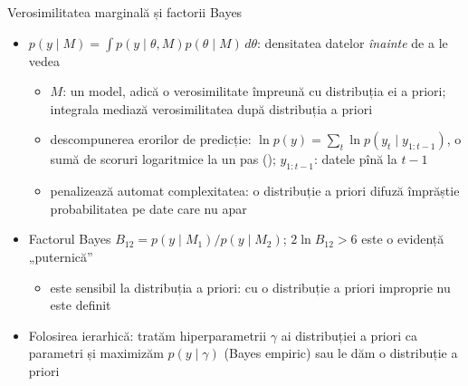 \begin{frame}{Verosimilitatea marginală și factorii Bayes}
\itemsize{\small}
\begin{itemize}
    \item \hypertarget{ch5ml}{}$p(y\mid M) = \int p(y\mid\theta, M)p(\theta\mid M)\,d\theta$: densitatea datelor \emph{înainte} de a le vedea
    \begin{itemize}
        \item $M$: un model, adică o verosimilitate împreună cu distribuția ei a priori; integrala mediază verosimilitatea după distribuția a priori
        \item descompunerea erorilor de predicție: $\ln p(y) = \sum_t \ln p(y_t\mid y_{1:t-1})$, o sumă de scoruri logaritmice la un pas (); $y_{1:t-1}$: datele pînă la $t - 1$
        \item penalizează automat complexitatea: o distribuție a priori difuză împrăștie probabilitatea pe date care nu apar
    \end{itemize}
    \item Factorul Bayes $B_{12} = p(y\mid M_1)/p(y\mid M_2)$; $2\ln B_{12} > 6$ este o evidență „puternică” 
    \begin{itemize}
        \item este sensibil la distribuția a priori: cu o distribuție a priori improprie nu este definit
    \end{itemize}
    \item Folosirea ierarhică: tratăm hiperparametrii $\gamma$ ai distribuției a priori ca parametri și maximizăm $p(y\mid\gamma)$ (Bayes empiric) sau le dăm o distribuție a priori 
\end{itemize}
\end{frame}

